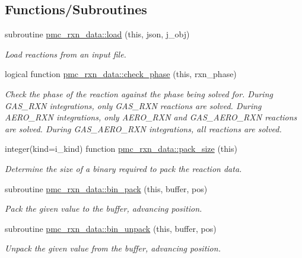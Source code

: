 \subsection*{Functions/\+Subroutines}
\begin{DoxyCompactItemize}
\item 
subroutine \mbox{\hyperlink{namespacepmc__rxn__data_abfbacb2e0a28ac87aa328f1f10dd4d8d}{pmc\+\_\+rxn\+\_\+data\+::load}} (this, json, j\+\_\+obj)
\begin{DoxyCompactList}\small\item\em Load reactions from an input file. \end{DoxyCompactList}\item 
logical function \mbox{\hyperlink{namespacepmc__rxn__data_a17716152aaaf50baf0bb3f07e9ede935}{pmc\+\_\+rxn\+\_\+data\+::check\+\_\+phase}} (this, rxn\+\_\+phase)
\begin{DoxyCompactList}\small\item\em Check the phase of the reaction against the phase being solved for. During G\+A\+S\+\_\+\+R\+XN integrations, only G\+A\+S\+\_\+\+R\+XN reactions are solved. During A\+E\+R\+O\+\_\+\+R\+XN integrations, only A\+E\+R\+O\+\_\+\+R\+XN and G\+A\+S\+\_\+\+A\+E\+R\+O\+\_\+\+R\+XN reactions are solved. During G\+A\+S\+\_\+\+A\+E\+R\+O\+\_\+\+R\+XN integrations, all reactions are solved. \end{DoxyCompactList}\item 
integer(kind=i\+\_\+kind) function \mbox{\hyperlink{namespacepmc__rxn__data_a0341adf3312d7d9b72c09ec6ec8aa869}{pmc\+\_\+rxn\+\_\+data\+::pack\+\_\+size}} (this)
\begin{DoxyCompactList}\small\item\em Determine the size of a binary required to pack the reaction data. \end{DoxyCompactList}\item 
subroutine \mbox{\hyperlink{namespacepmc__rxn__data_a397299ecd34b75d7ad2d796c4aceb359}{pmc\+\_\+rxn\+\_\+data\+::bin\+\_\+pack}} (this, buffer, pos)
\begin{DoxyCompactList}\small\item\em Pack the given value to the buffer, advancing position. \end{DoxyCompactList}\item 
subroutine \mbox{\hyperlink{namespacepmc__rxn__data_a34d8d3f14de156535b1d784d320f459b}{pmc\+\_\+rxn\+\_\+data\+::bin\+\_\+unpack}} (this, buffer, pos)
\begin{DoxyCompactList}\small\item\em Unpack the given value from the buffer, advancing position. \end{DoxyCompactList}\item 

\end{DoxyCompactItemize}
